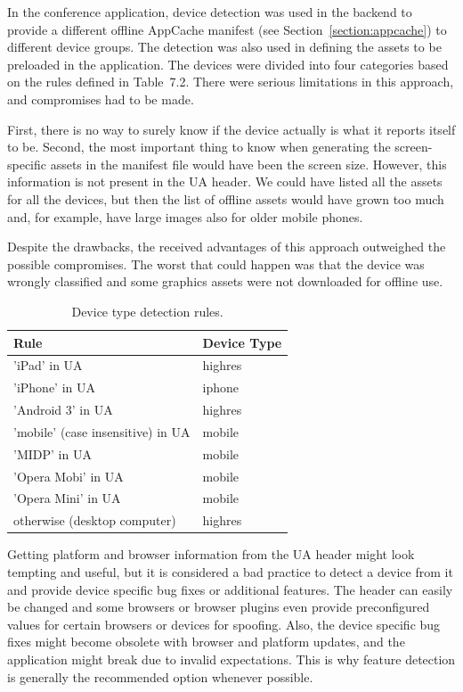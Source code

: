 In the conference application, device detection was used in the
backend to provide a different offline AppCache manifest (see
Section~\ref{section:appcache}) to different device groups. The
detection was also used in defining the assets to be preloaded in the
application. The devices were divided into four categories based on
the rules defined in Table~7.2\tableref. There were serious
limitations in this approach, and compromises had to be made.

First, there is no way to surely know if the device actually is what
it reports itself to be. Second, the most important thing to know when
generating the screen-specific assets in the manifest file would have
been the screen size. However, this information is not present in the
UA header. We could have listed all the assets for all the devices,
but then the list of offline assets would have grown too much and, for
example, have large images also for older mobile phones.

Despite the drawbacks, the received advantages of this approach
outweighed the possible compromises. The worst that could happen was
that the device was wrongly classified and some graphics assets were
not downloaded for offline use.

\begin{table}
  \begin{tabular}{ l | l }
    \textbf{Rule} & \textbf{Device Type} \\ \hline
    'iPad' in UA & highres \\
    'iPhone' in UA & iphone \\
    'Android 3' in UA & highres \\
    'mobile' (case insensitive) in UA & mobile \\
    'MIDP' in UA & mobile \\
    'Opera Mobi' in UA & mobile \\
    'Opera Mini' in UA & mobile \\
    otherwise (desktop computer) & highres
  \end{tabular}
  \label{table:device-detection-rules}
  \caption{Device type detection rules.}
\end{table}

Getting platform and browser information from the UA header might look
tempting and useful, but it is considered a bad practice to detect a
device from it and provide device specific bug fixes or additional
features. The header can easily be changed and some browsers or
browser plugins even provide preconfigured values for certain browsers
or devices for spoofing. Also, the device specific bug fixes might
become obsolete with browser and platform updates, and the application
might break due to invalid expectations. This is why feature detection
is generally the recommended option whenever possible.


